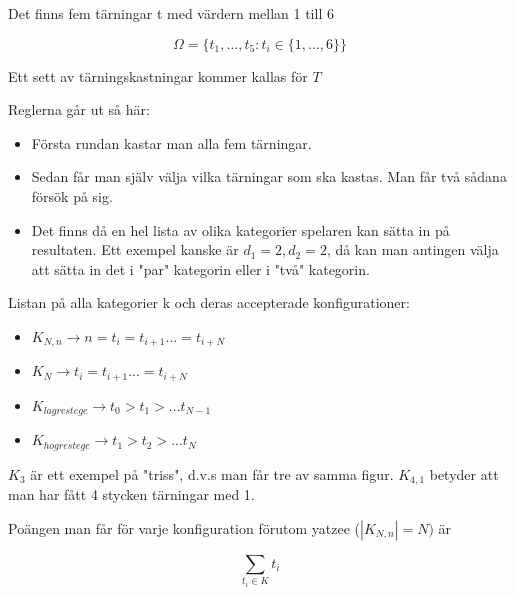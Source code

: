 

Det finns fem tärningar t med värdern mellan 1 till 6

\begin{equation}
    \Omega=\{t_1,...,t_5:t_i\in\{1,...,6\}\}
\end{equation}

Ett sett av tärningskastningar kommer kallas för $T$

Reglerna går ut så här:
\begin{itemize}
    \item Första rundan kastar man alla fem tärningar.
    \item Sedan får man själv välja vilka tärningar som ska kastas. Man får två sådana försök på sig.
    \item Det finns då en hel lista av olika kategorier spelaren kan sätta in på resultaten. Ett exempel kanske är $d_1=2, d_2=2$, 
då kan man antingen välja att sätta in det i "par" kategorin eller i "två" kategorin.
\end{itemize}

Listan på alla kategorier k och deras accepterade konfigurationer:
\begin{itemize}
    \item $K_{N,n} \rightarrow n=t_i=t_{i+1}...=t_{i+N}$
    \item $K_{N} \rightarrow t_i=t_{i+1}...=t_{i+N}$
    \item $K_{lagrestege} \rightarrow t_0>t_1>...t_{N-1}$
    \item $K_{hogrestege} \rightarrow t_1>t_2>...t_{N}$
\end{itemize}

$K_3$ är ett exempel på "triss", d.v.s man får tre av samma figur. $K_{4,1}$ betyder att man har fått 4 stycken tärningar med 1.

Poängen man får för varje konfiguration förutom yatzee ($|K_{N,n}|=N)$ är 

\begin{equation}
    \sum_{t_i\in K}t_i 
\end{equation}





